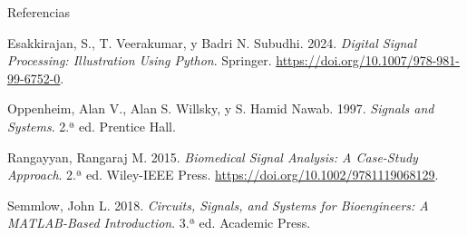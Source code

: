 \documentclass[
  ignorenonframetext,
  aspectratio=169,
  spanish,
]{beamer}
\newlength{\cslhangindent}
\newenvironment{CSLReferences}[2] %
 {\begin{list}{}{%
  \setlength{\itemindent}{0pt}
  \setlength{\leftmargin}{0pt}
  \setlength{\parsep}{0pt}
  \ifodd #1
   \setlength{\leftmargin}{\cslhangindent}
   \setlength{\itemindent}{-1\cslhangindent}
  \fi
  \setlength{\itemsep}{#2\baselineskip}}}
 {\end{list}}
\begin{document}
\begin{frame}[allowframebreaks]{Referencias}
  \protect{}\label{referencias}
  \protect{}\label{refs}
  \begin{CSLReferences}{1}{1}
    Esakkirajan, S., T. Veerakumar, y Badri N. Subudhi. 2024. \emph{Digital
      Signal Processing: Illustration Using Python}. Springer.
    \url{https://doi.org/10.1007/978-981-99-6752-0}.

    Oppenheim, Alan V., Alan S. Willsky, y S. Hamid Nawab. 1997.
    \emph{Signals and Systems}. 2.ª ed. Prentice Hall.

    Rangayyan, Rangaraj M. 2015. \emph{Biomedical Signal Analysis: A
      Case-Study Approach}. 2.ª ed. Wiley-IEEE Press.
    \url{https://doi.org/10.1002/9781119068129}.

    Semmlow, John L. 2018. \emph{Circuits, Signals, and Systems for
      Bioengineers: A MATLAB-Based Introduction}. 3.ª ed. Academic Press.

  \end{CSLReferences}
\end{frame}
\end{document}
